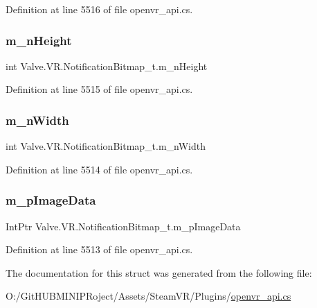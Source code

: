 Definition at line 5516 of file openvr\+\_\+api.\+cs.

\mbox{\label{struct_valve_1_1_v_r_1_1_notification_bitmap__t_a1000770ed9683610226a9362c6161af8}} 
\subsubsection{\texorpdfstring{m\_nHeight}{m\_nHeight}}
{\footnotesize\ttfamily int Valve.\+V\+R.\+Notification\+Bitmap\+\_\+t.\+m\+\_\+n\+Height}



Definition at line 5515 of file openvr\+\_\+api.\+cs.

\mbox{\label{struct_valve_1_1_v_r_1_1_notification_bitmap__t_a81ff2fc6f66961fe9c2d795196f46071}} 
\subsubsection{\texorpdfstring{m\_nWidth}{m\_nWidth}}
{\footnotesize\ttfamily int Valve.\+V\+R.\+Notification\+Bitmap\+\_\+t.\+m\+\_\+n\+Width}



Definition at line 5514 of file openvr\+\_\+api.\+cs.

\mbox{\label{struct_valve_1_1_v_r_1_1_notification_bitmap__t_a404bdb78acc61cd046234adc1b22abfd}} 
\subsubsection{\texorpdfstring{m\_pImageData}{m\_pImageData}}
{\footnotesize\ttfamily Int\+Ptr Valve.\+V\+R.\+Notification\+Bitmap\+\_\+t.\+m\+\_\+p\+Image\+Data}



Definition at line 5513 of file openvr\+\_\+api.\+cs.



The documentation for this struct was generated from the following file\+:\begin{DoxyCompactItemize}
\item 
O\+:/\+Git\+H\+U\+B\+M\+I\+N\+I\+P\+Roject/\+Assets/\+Steam\+V\+R/\+Plugins/\mbox{\hyperlink{openvr__api_8cs}{openvr\+\_\+api.\+cs}}\end{DoxyCompactItemize}

